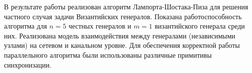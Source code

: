 В результате работы реализован алгоритм Лампорта-Шостака-Пиза для решения частного случая задачи Византийских генералов. Показана работоспособность алгоритма для $n = 5$ честных генералов и $m = 1$  византийского генерала среди них. Реализована модель взаимодействия между генералами (независимыми узлами) на сетевом и канальном уровне. Для обеспечения корректной работы параллельного алгоритма были использованы различные примитивы синхронизации.